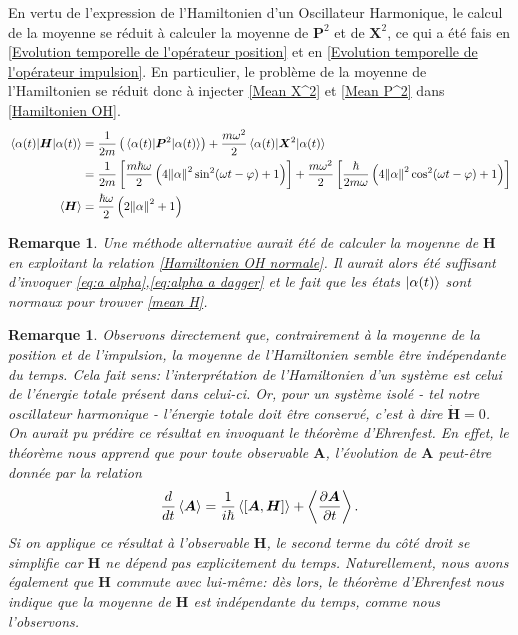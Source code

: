 \documentclass[11pt,oneside,a4paper]{article}
\newcommand{\h}{\ensuremath{\hbar}}
\newtheorem{remark}[theorem]{Remarque}
\begin{document}
En vertu de l'expression de l'Hamiltonien d'un Oscillateur Harmonique, le calcul de la moyenne se réduit à calculer la moyenne de $\bm{P}^2$ et de $\bm{X}^2$, ce qui a été fais en \ref{Evolution temporelle de l'opérateur position} et en \ref{Evolution temporelle de l'opérateur impulsion}. En particulier, le problème de la moyenne de l'Hamiltonien se réduit donc à injecter \eqref{Mean X^2} et \eqref{Mean P^2} dans \eqref{Hamiltonien OH}.
\begin{align}
  \expval{\bm{H}}{\alpha(t)} &= \frac{1}{2m}\left(\expval{\bm{P}^2}{\alpha(t)}\right) + \frac{m\omega^2}{2}\expval{\bm{X}^2}{\alpha(t)}\notag\\
  &= \frac{1}{2m} \left[\frac{m\h\omega}{2}\left(4\norm{\alpha}^2\sin^2(\omega t-\varphi)+1\right)\right] + \frac{m\omega^2}{2}\left[\frac{\h}{2m\omega}\left(4\norm{\alpha}^2\cos^2(\omega t-\varphi)+1\right)\right]\notag\\
  \expval{\bm{H}} &= \frac{\h\omega}{2}\left(2\norm{\alpha}^2+1\right)\label{mean H}
\end{align}
\begin{remark}
  Une méthode alternative aurait été de calculer la moyenne de $\bm{H}$ en exploitant la relation \eqref{Hamiltonien OH normale}. Il aurait alors été suffisant d'invoquer \eqref{eq:a alpha},\eqref{eq:alpha a dagger} et le fait que les états $\ket{\alpha(t)}$ sont normaux pour trouver \eqref{mean H}. 
\end{remark}
\begin{remark}
  Observons directement que, contrairement à la moyenne de la position et de l'impulsion, la moyenne de l'Hamiltonien semble être indépendante du temps. Cela fait sens: l'interprétation de l'Hamiltonien d'un système est celui de l'énergie totale présent dans celui-ci. Or, pour un système isolé - tel notre oscillateur harmonique - l'énergie totale doit être conservé, c'est à dire $\dot{\bm{H}} = 0$. On aurait pu prédire ce résultat en invoquant le \emph{théorème d'Ehrenfest}. En effet, le théorème nous apprend que pour toute observable $\bm{A}$, l'évolution de $\bm{A}$ peut-être donnée par la relation
  \begin{equation*}
    \frac{d}{dt}\expval{\bm{A}} = \frac{1}{i\h}\expval{[\bm{A},\bm{H}]}+\expval{\frac{\partial \bm{A}}{\partial t}}.
  \end{equation*}
  Si on applique ce résultat à l'observable $\bm{H}$, le second terme du côté droit se simplifie car $\bm{H}$ ne dépend pas explicitement du temps. Naturellement, nous avons également que $\bm{H}$ commute avec lui-même: dès lors, le théorème d'Ehrenfest nous indique que la moyenne de $\bm{H}$ est \emph{indépendante du temps}, comme nous l'observons.
\end{remark}
\end{document}
